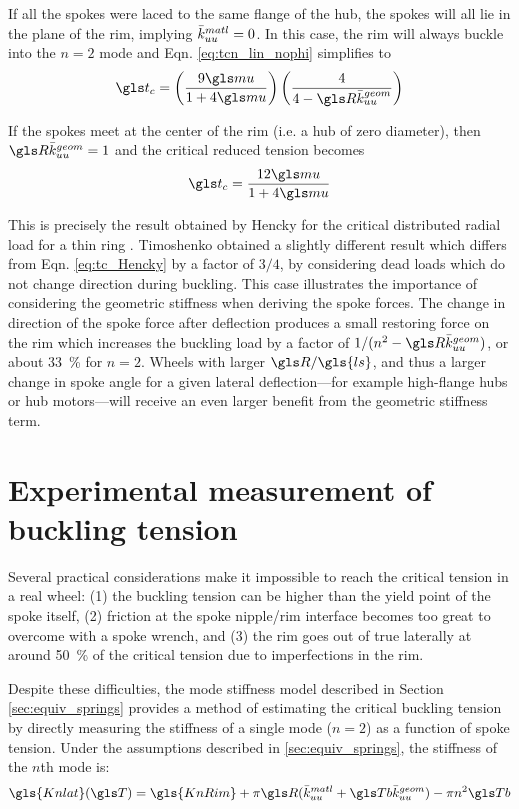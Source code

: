 \documentclass[\rootdir/thesis.tex]{subfiles}
\begin{document}
If all the spokes were laced to the same flange of the hub, the spokes will all lie in the plane of the rim, implying $\bar{k}_{uu}^{matl}=0$. In this case, the rim will always buckle into the $n=2$ mode and Eqn. \eqref{eq:tcn_lin_nophi} simplifies to
\begin{equation}
\ts_c = \left(\frac{9\m}{1 + 4\m}\right)\left(\frac{4}{4 - \R\geom{\kuu}}\right)
\end{equation}

If the spokes meet at the center of the rim (i.e. a hub of zero diameter), then $\R\geom{\kuu}=1$ and the critical reduced tension becomes
\begin{equation}
\label{eq:tc_Hencky}
\ts_c = \frac{12\m}{1 + 4\m}
\end{equation}

This is precisely the result obtained by Hencky for the critical distributed radial load for a thin ring \cite{Timoshenko1961}. Timoshenko obtained a slightly different result which differs from Eqn. \eqref{eq:tc_Hencky} by a factor of  $3/4$, by considering dead loads which do not change direction during buckling. This case illustrates the importance of considering the geometric stiffness when deriving the spoke forces. The change in direction of the spoke force after deflection produces a small restoring force on the rim which increases the buckling load by a factor of $1/(n^2 - \R\geom{\kuu})$, or about \SI{33}{\percent} for $n=2$. Wheels with larger $\R/\gls{ls}$, and thus a larger change in spoke angle for a given lateral deflection---for example high-flange hubs or hub motors---will receive an even larger benefit from the geometric stiffness term.

\section{Experimental measurement of buckling tension}
\label{sec:K2_tension_buckling}

Several practical considerations make it impossible to reach the critical tension in a real wheel: (1) the buckling tension can be higher than the yield point of the spoke itself, (2) friction at the spoke nipple/rim interface becomes too great to overcome with a spoke wrench, and (3) the rim goes out of true laterally at around \SI{50}{\percent} of the critical tension due to imperfections in the rim.

Despite these difficulties, the mode stiffness model described in Section \ref{sec:equiv_springs} provides a method of estimating the critical buckling tension by directly measuring the stiffness of a single mode ($n=2$) as a function of spoke tension. Under the assumptions described in \ref{sec:equiv_springs}, the stiffness of the $n$th mode is:
\begin{equation}
\label{eq:Kn_buckling}
\gls{Knlat}(\T) = \gls{KnRim} + \pi \R (\matl{\kuu} + \Tb \geom{\kuu}) - \pi n^2 \Tb
\end{equation}
\end{document}
